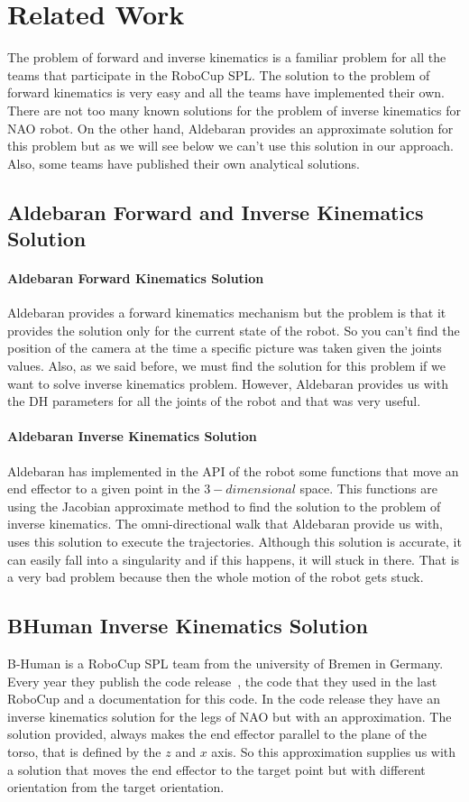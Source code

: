 \chapter{Related Work}
\label{related}
The problem of forward and inverse kinematics is a familiar problem for all the teams that participate in the RoboCup SPL. The solution to the problem of forward kinematics is very easy and all the teams have implemented their own. There are not too many known solutions for the problem of inverse kinematics for NAO robot. On the other hand, Aldebaran provides an approximate solution for this problem but as we will see below we can't use this solution in our approach. Also, some teams have published their own analytical solutions.
\section{Aldebaran Forward and Inverse Kinematics Solution}
\subsubsection*{Aldebaran Forward Kinematics Solution}
Aldebaran provides a forward kinematics mechanism but the problem is that it provides the solution only for the current state of the robot. So you can't find the position of the camera at the time a specific picture was taken given the joints values. Also, as we said before, we must find the solution for this problem if we want to solve inverse kinematics problem. However, Aldebaran provides us with the DH parameters for all the joints of the robot and that was very useful.
\subsubsection*{Aldebaran Inverse Kinematics Solution}
Aldebaran has implemented in the API of the robot some functions that move an end effector to a given point in the \(3-dimensional\) space. This functions are using the Jacobian approximate method to find the solution to the problem of inverse kinematics. The omni-directional walk that Aldebaran provide us with, uses this solution to execute the trajectories. Although this solution is accurate, it can easily fall into a singularity and if this happens, it will stuck in there. That is a very bad problem because then the whole motion of the robot gets stuck.
\section{BHuman Inverse Kinematics Solution}
B-Human is a RoboCup SPL team from the university of Bremen in Germany. Every year they publish the code release~\cite{bhuman}, the code that they used in the last RoboCup and a documentation for this code. In the code release they have an inverse kinematics solution for the legs of NAO but with an approximation. The solution provided, always makes the end effector parallel to the plane of the torso, that is defined by the \(z\) and \(x\) axis. So this approximation supplies us with a solution that moves the end effector to the target point but with different orientation from the target orientation.
